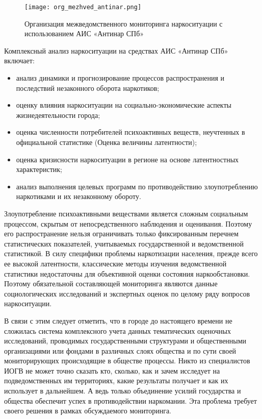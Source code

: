 \begin{figure}
    \centering
    \texttt{[image: org\_mezhved\_antinar.png]}
    \caption{Организация межведомственного мониторинга наркоситуации с
    использованием АИС «Антинар СПб»}
    \label{fig:org_mezhved_antinar}
\end{figure}

Комплексный анализ наркоситуации на средствах АИС «Антинар СПб» включает:
\begin{itemize}
\item анализ динамики и прогнозирование  процессов  распространения и последствий
незаконного оборота наркотиков;
\item оценку влияния наркоситуации на социально-экономические аспекты
жизнедеятельности города;
\item оценка численности потребителей психоактивных веществ, неучтенных в
официальной статистике (Оценка величины латентности);
\item оценка кризисности наркоситуации в регионе на основе латентностных
характеристик;
\item анализ выполнения целевых программ по противодействию злоупотреблению
наркотиками и их незаконному обороту.
\end{itemize}

Злоупотребление психоактивными веществами является сложным социальным процессом,
скрытым от непосредственного наблюдения и оценивания. Поэтому его
распространение нельзя ограничивать только фиксированным перечнем статистических
показателей, учитываемых государственной и ведомственной статистикой. В силу
специфики проблемы наркотизации населения, прежде всего ее высокой латентности,
классические методы изучения ведомственной статистики недостаточны для
объективной оценки состояния наркообстановки. Поэтому обязательной составляющей
мониторинга являются данные социологических исследований и экспертных оценок  по
целому ряду вопросов наркоситуации.

В связи с этим следует отметить, что в городе до настоящего времени не сложилась
система комплексного учета данных тематических оценочных исследований,
проводимых государственными структурами и общественными организациями или
фондами  в различных слоях общества и по сути своей мониторирующих происходящие
в обществе процессы. Никто из специалистов  ИОГВ не может точно сказать кто,
сколько, как и зачем исследует на подведомственных им территориях, какие
результаты получает и как их использует в дальнейшем. А ведь только объединение
усилий государства и общества обеспечит успех в противодействии наркомании. Эта
проблема требует своего решения в рамках обсуждаемого мониторинга.

